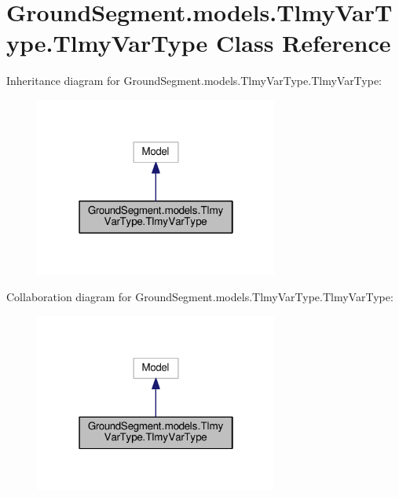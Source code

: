 \hypertarget{class_ground_segment_1_1models_1_1_tlmy_var_type_1_1_tlmy_var_type}{}\section{Ground\+Segment.\+models.\+Tlmy\+Var\+Type.\+Tlmy\+Var\+Type Class Reference}
\label{class_ground_segment_1_1models_1_1_tlmy_var_type_1_1_tlmy_var_type}


Inheritance diagram for Ground\+Segment.\+models.\+Tlmy\+Var\+Type.\+Tlmy\+Var\+Type\+:\nopagebreak
\begin{figure}[H]
\begin{center}
\leavevmode
\includegraphics[width=226pt]{class_ground_segment_1_1models_1_1_tlmy_var_type_1_1_tlmy_var_type__inherit__graph}
\end{center}
\end{figure}


Collaboration diagram for Ground\+Segment.\+models.\+Tlmy\+Var\+Type.\+Tlmy\+Var\+Type\+:\nopagebreak
\begin{figure}[H]
\begin{center}
\leavevmode
\includegraphics[width=226pt]{class_ground_segment_1_1models_1_1_tlmy_var_type_1_1_tlmy_var_type__coll__graph}
\end{center}
\end{figure}
